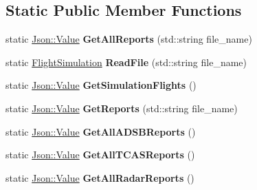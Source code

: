 \subsection*{Static Public Member Functions}
\begin{DoxyCompactItemize}
\item 
\hypertarget{class_simulation_flights_i_o_a4ececfae030e214ad33310e1ea5972c4}{}static \hyperlink{class_json_1_1_value}{Json\+::\+Value} {\bfseries Get\+All\+Reports} (std\+::string file\+\_\+name)\label{class_simulation_flights_i_o_a4ececfae030e214ad33310e1ea5972c4}

\item 
\hypertarget{class_simulation_flights_i_o_a60a94a3c3bb5b38a8372e033023c120c}{}static \hyperlink{class_flight_simulation}{Flight\+Simulation} {\bfseries Read\+File} (std\+::string file\+\_\+name)\label{class_simulation_flights_i_o_a60a94a3c3bb5b38a8372e033023c120c}

\item 
\hypertarget{class_simulation_flights_i_o_a0fecd6176618527ce882c1bd705cea2e}{}static \hyperlink{class_json_1_1_value}{Json\+::\+Value} {\bfseries Get\+Simulation\+Flights} ()\label{class_simulation_flights_i_o_a0fecd6176618527ce882c1bd705cea2e}

\item 
\hypertarget{class_simulation_flights_i_o_ab02d0349153e24e2067999c92d70835d}{}static \hyperlink{class_json_1_1_value}{Json\+::\+Value} {\bfseries Get\+Reports} (std\+::string file\+\_\+name)\label{class_simulation_flights_i_o_ab02d0349153e24e2067999c92d70835d}

\item 
\hypertarget{class_simulation_flights_i_o_a5e17481319fed6d1f4a324cabf2f9f68}{}static \hyperlink{class_json_1_1_value}{Json\+::\+Value} {\bfseries Get\+All\+A\+D\+S\+B\+Reports} ()\label{class_simulation_flights_i_o_a5e17481319fed6d1f4a324cabf2f9f68}

\item 
\hypertarget{class_simulation_flights_i_o_adace89786d88373966ae13d357c85aee}{}static \hyperlink{class_json_1_1_value}{Json\+::\+Value} {\bfseries Get\+All\+T\+C\+A\+S\+Reports} ()\label{class_simulation_flights_i_o_adace89786d88373966ae13d357c85aee}

\item 
\hypertarget{class_simulation_flights_i_o_a87b26150fe71900cb80a042f0788bc0b}{}static \hyperlink{class_json_1_1_value}{Json\+::\+Value} {\bfseries Get\+All\+Radar\+Reports} ()\label{class_simulation_flights_i_o_a87b26150fe71900cb80a042f0788bc0b}


\end{DoxyCompactItemize}

